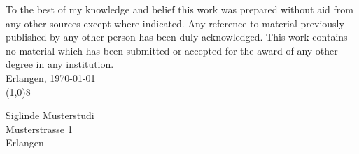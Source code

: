 
\vspace*{1cm}

To the best of my knowledge and belief this work was prepared without aid from any other sources except where indicated. Any reference to material previously published by any other person has been duly acknowledged. This work contains no material which has been submitted or accepted for the award of any other degree in any institution.\\[30mm]
%
Erlangen, \today\\[20mm]
%
\line(1,0){8}\\[2mm]
%
\hspace*{25mm}
\parbox[h]{80mm}{%
  \small
  Siglinde Musterstudi\\
  Musterstrasse 1\\
  Erlangen}

